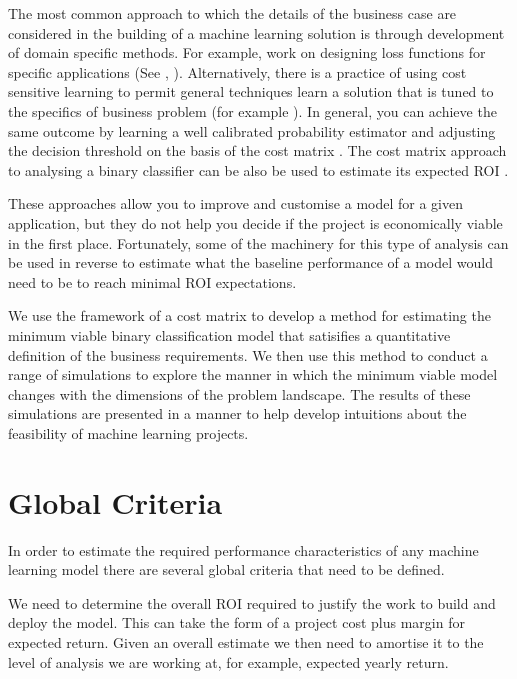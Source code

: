 \documentclass[12pt,a4paper]{article}
\numberwithin{equation}{section}
\begin{document}
The most common approach to which the details of the business case are considered in the building of a machine
learning solution is through development of domain specific methods. For example, work on designing
loss functions for specific applications (See \cite{Johnson19}, \cite{Hennig2007}). Alternatively, there is a
practice of using cost sensitive learning \cite{Domingos1999,Margineantu2000,Elkan2001,Tian+Zhang2019}
to permit general techniques learn a solution that is tuned to the 
specifics of business problem (for example \cite{Fatlawi2017}). In general, you can achieve
the same outcome by learning a well calibrated probability estimator and adjusting the decision threshold
on the basis of the cost matrix \cite{Nikolaou2016}.
The cost matrix approach to analysing a binary classifier can be also be used to estimate its expected ROI \cite{Ylijoki2018}.

These approaches allow you
to improve and customise a model for a given application, but they do not help you decide if the project is
economically viable in the first place.
Fortunately, some of the machinery for this type of
analysis can be used in reverse to estimate what the baseline performance of a model would need to be to reach
minimal ROI expectations.

We use the framework of a cost matrix to develop a method for estimating the minimum viable binary classification
model that satisifies a quantitative definition of the business requirements.
We then use this method to conduct a range of simulations to explore the manner in which the minimum viable
model changes with the dimensions of the problem landscape. 
The results of these simulations are presented in a manner to help develop
intuitions about the feasibility of machine learning projects.

\section{Global Criteria}

In order to estimate the required performance characteristics of any machine learning model there are several 
global criteria that need to be defined. 

We need to determine the overall ROI required to justify the work to
build and deploy the model. This can take the form of a project cost plus margin for expected return.
Given an overall estimate we then need to amortise it to the level of analysis we are working at,
for example, expected yearly return.
 
\end{document}
